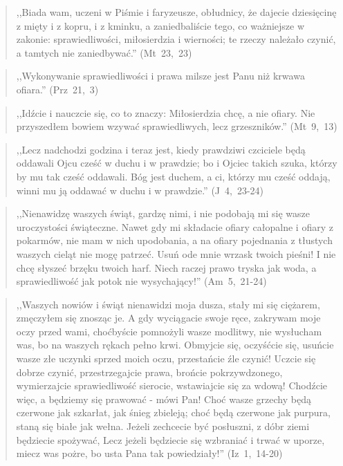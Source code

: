 \documentclass[10pt,a4paper,oneside]{article}
\begin{document}
\begin{quote}
,,Biada wam, uczeni w Piśmie i faryzeusze, obłudnicy, że dajecie dziesięcinę z mięty i z kopru, i z kminku, a zaniedbaliście tego, co ważniejsze w zakonie: sprawiedliwości, miłosierdzia i wierności; te rzeczy należało czynić, a tamtych nie zaniedbywać.'' \mbox{(Mt 23, 23)}
\end{quote}
\begin{quote}
,,Wykonywanie sprawiedliwości i prawa milsze jest Panu niż krwawa ofiara.'' \mbox{(Prz 21, 3)}
\end{quote}
\begin{quote}
,,Idźcie i nauczcie się, co to znaczy: Miłosierdzia chcę, a nie ofiary. Nie przyszedłem bowiem wzywać sprawiedliwych, lecz grzeszników.'' \mbox{(Mt 9, 13)}
\end{quote}
\begin{quote}
,,Lecz nadchodzi godzina i teraz jest, kiedy prawdziwi czciciele będą oddawali Ojcu cześć w duchu i w prawdzie; bo i Ojciec takich szuka, którzy by mu tak cześć oddawali. Bóg jest duchem, a ci, którzy mu cześć oddają, winni mu ją oddawać w duchu i w prawdzie.'' \mbox{(J 4, 23-24)}
\end{quote}
\begin{quote}
,,Nienawidzę waszych świąt, gardzę nimi, i nie podobają mi się wasze uroczystości świąteczne. Nawet gdy mi składacie ofiary całopalne i ofiary z pokarmów, nie mam w nich upodobania, a na ofiary pojednania z tłustych waszych cieląt nie mogę patrzeć. Usuń ode mnie wrzask twoich pieśni! I nie chcę słyszeć brzęku twoich harf. Niech raczej prawo tryska jak woda, a sprawiedliwość jak potok nie wysychający!'' \mbox{(Am 5, 21-24)}
\end{quote}
\begin{quote}
,,Waszych nowiów i świąt nienawidzi moja dusza, stały mi się ciężarem, zmęczyłem się znosząc je. A gdy wyciągacie swoje ręce, zakrywam moje oczy przed wami, choćbyście pomnożyli wasze modlitwy, nie wysłucham was, bo na waszych rękach pełno krwi. Obmyjcie się, oczyśćcie się, usuńcie wasze złe uczynki sprzed moich oczu, przestańcie źle czynić! Uczcie się dobrze czynić, przestrzegajcie prawa, brońcie pokrzywdzonego, wymierzajcie sprawiedliwość sierocie, wstawiajcie się za wdową! Chodźcie więc, a będziemy się prawować - mówi Pan! Choć wasze grzechy będą czerwone jak szkarłat, jak śnieg zbieleją; choć będą czerwone jak purpura, staną się białe jak wełna. Jeżeli zechcecie być posłuszni, z dóbr ziemi będziecie spożywać, Lecz jeżeli będziecie się wzbraniać i trwać w uporze, miecz was pożre, bo usta Pana tak powiedziały!'' \mbox{(Iz 1, 14-20)}
\end{quote}
\end{document}

